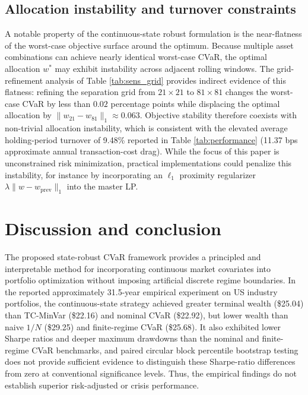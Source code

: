 \documentclass[smallextended]{svjour3}
\begin{document}
\subsection{Allocation instability and turnover constraints}
A notable property of the continuous-state robust formulation is the near-flatness of the worst-case objective surface around the optimum. Because multiple asset combinations can achieve nearly identical worst-case CVaR, the optimal allocation $w^*$ may exhibit instability across adjacent rolling windows. The grid-refinement analysis of Table \ref{tab:sens_grid} provides indirect evidence of this flatness: refining the separation grid from $21\times21$ to $81\times81$ changes the worst-case CVaR by less than $0.02$ percentage points while displacing the optimal allocation by $\|w_{21}-w_{81}\|_1 \approx 0.063$. Objective stability therefore coexists with non-trivial allocation instability, which is consistent with the elevated average holding-period turnover of 9.48\% reported in Table \ref{tab:performance} (11.37 bps approximate annual transaction-cost drag). While the focus of this paper is unconstrained risk minimization, practical implementations could penalize this instability, for instance by incorporating an $\ell_1$ proximity regularizer $\lambda \|w - w_{\mathrm{prev}}\|_1$ into the master LP.


\section{Discussion and conclusion}
The proposed state-robust CVaR framework provides a principled and interpretable method for incorporating continuous market covariates into portfolio optimization without imposing artificial discrete regime boundaries. In the reported approximately 31.5-year empirical experiment on US industry portfolios, the continuous-state strategy achieved greater terminal wealth (\$25.04) than TC-MinVar (\$22.16) and nominal CVaR (\$22.92), but lower wealth than naive $1/N$ (\$29.25) and finite-regime CVaR (\$25.68). It also exhibited lower Sharpe ratios and deeper maximum drawdowns than the nominal and finite-regime CVaR benchmarks, and paired circular block percentile bootstrap testing does not provide sufficient evidence to distinguish these Sharpe-ratio differences from zero at conventional significance levels. Thus, the empirical findings do not establish superior risk-adjusted or crisis performance.
\end{document}
